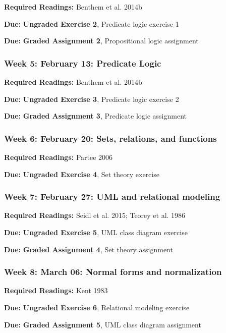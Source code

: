 \documentclass[]{article}
\begin{document}
\textbf{Required Readings:} Benthem et al. 2014b

\textbf{Due:} \textbf{Ungraded Exercise 2}, Predicate logic exercise 1

\textbf{Due:} \textbf{Graded Assignment 2}, Propositional logic
assignment

\subsubsection{Week 5: February 13: Predicate
Logic}\label{week-5-february-13-predicate-logic}

\textbf{Required Readings:} Benthem et al. 2014b

\textbf{Due:} \textbf{Ungraded Exercise 3}, Predicate logic exercise 2

\textbf{Due:} \textbf{Graded Assignment 3}, Predicate logic assignment

\subsubsection{Week 6: February 20: Sets, relations, and
functions}\label{week-6-february-20-sets-relations-and-functions}

\textbf{Required Readings:} Partee 2006

\textbf{Due:} \textbf{Ungraded Exercise 4}, Set theory exercise

\subsubsection{Week 7: February 27: UML and relational
modeling}\label{week-7-february-27-uml-and-relational-modeling}

\textbf{Required Readings:} Seidl et al. 2015; Teorey et al. 1986

\textbf{Due:} \textbf{Ungraded Exercise 5}, UML class diagram exercise

\textbf{Due:} \textbf{Graded Assignment 4}, Set theory assignment

\subsubsection{Week 8: March 06: Normal forms and
normalization}\label{week-8-march-06-normal-forms-and-normalization}

\textbf{Required Readings:} Kent 1983

\textbf{Due:} \textbf{Ungraded Exercise 6}, Relational modeling exercise

\textbf{Due:} \textbf{Graded Assignment 5}, UML class diagram assignment
\end{document}

